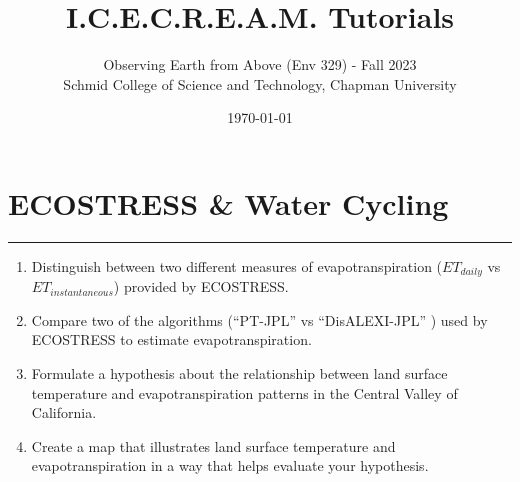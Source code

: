 \documentclass[oneside,a4paper,11pt,explicit]{book}
\title{I.C.E.C.R.E.A.M. Tutorials}
\subtitle{\small Observing Earth from Above (Env 329) - Fall 2023  \\
	\small Schmid College of Science and Technology, Chapman University}
\date{\today}
\begin{document}
\dominitoc


\setcounter{chapter}{5} %

\chapter{ECOSTRESS \& Water Cycling} %

\vspace{-2em}

\minitoc

\hrule

\vspace{1em}

\begin{tcolorbox}[enhanced,frame style image=blueshade.png,
	opacityback=0.75,opacitybacktitle=0.25,
	colback=blue!5!white,colframe=blue!75!black,title={\Large \textbf{Objectives:}}]
	\large
	\begin{enumerate}
		\item Distinguish between two different measures of evapotranspiration ($ET_{daily}$ vs $ET_{instantaneous}$) provided by ECOSTRESS.
		\item  Compare two of the algorithms (``PT-JPL'' vs ``DisALEXI-JPL'' ) used by ECOSTRESS to estimate evapotranspiration.
		\item Formulate a hypothesis about the relationship between land surface temperature and evapotranspiration patterns in the Central Valley of California.
		\item Create a map that illustrates land surface temperature and evapotranspiration in a way that helps evaluate your hypothesis. 
	\end{enumerate}
\end{tcolorbox}

\clearpage

\fancyhead{}
\end{document}
